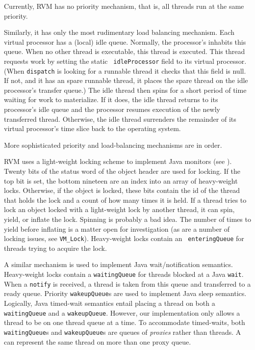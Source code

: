 Currently, RVM has no priority mechanism, that is, all threads run
at the same priority.

Similarly, it has only the most rudimentary load balancing mechanism.
Each virtual processor has a (local) idle queue.  Normally, the
processor's  inhabits
this queue.  When no other thread is executable, this thread is
executed.  This thread requests work by setting the static {\tt
idleProcessor} field to its virtual processor.  (When {\tt dispatch}
is looking for a runnable thread it checks that this field is null.
If not, and it has an spare runnable thread, it places the spare
thread on the idle processor's transfer queue.)  The idle thread then
spins for a short period of time waiting for work to materialize.  If
it does, the idle thread returns to its processor's idle queue and
the processor resumes execution of the newly transferred thread.
Otherwise, the idle thread surrenders the remainder of its virtual
processor's time slice back to the operating system.

More sophisticated priority and load-balancing mechanisms are in
order.

RVM uses a light-weight locking scheme to implement Java monitors (see
).  Twenty bits of the status word of 
the object header are used for locking.  If the top bit is set, the
bottom nineteen are an index into an array of heavy-weight locks.
Otherwise, if the object is locked, these bits contain the id of the
thread that holds the lock and a count of how many times it is held.
If a thread tries to lock an object locked with a light-weight lock by
another thread, it can spin, yield, or inflate the lock.  Spinning is
probably a bad idea.  The number of times to yield before inflating is
a matter open for investigation (as are a number of locking
issues, see {\tt VM\_Lock}).  Heavy-weight locks contain an {\tt
enteringQueue} for threads trying to acquire the lock.

A similar mechanism is used to implement Java wait/notification
semantics.  Heavy-weight locks contain a {\tt waitingQueue} for
threads blocked at a Java {\tt wait}.  When a {\tt notify} is
received, a thread is taken from this queue and transferred to a ready
queue.  Priority {\tt wakeupQueue}s are used to implement Java sleep
semantics.  Logically, Java timed-wait semantics entail placing a
thread on both a {\tt waitingQueue} and a {\tt wakeupQueue}.  However, our
implementation only allows a thread to be on one thread queue at
a time.  To accommodate timed-waits, both {\tt waitingQueue}s and
{\tt wakeupQueue}s are queues of {\em proxies} rather than threads.
A  can represent the same thread
on more than one proxy queue.

\JavaTMFooter